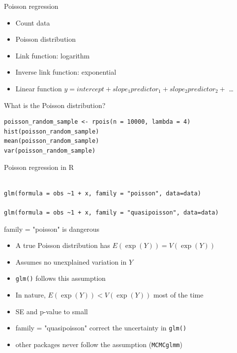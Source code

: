 \documentclass{beamer}
\makeatletter
\newenvironment{kframe}{%
 \def\at@end@of@kframe{}%
 \ifinner\ifhmode%
  \def\at@end@of@kframe{\end{minipage}}%
  \begin{minipage}{\columnwidth}%
 \fi\fi%
 \def\FrameCommand##1{\hskip\@totalleftmargin \hskip-\fboxsep
 \colorbox{shadecolor}{##1}\hskip-\fboxsep
     \hskip-\linewidth \hskip-\@totalleftmargin \hskip\columnwidth}%
 \MakeFramed {\advance\hsize-\width
   \@totalleftmargin\z@ \linewidth\hsize
   \@setminipage}}%
 {\par\unskip\endMakeFramed%
 \at@end@of@kframe}
\newenvironment{knitrout}{}{} %
\makeatother
\begin{document}
\begin{frame}{Poisson regression}
  \begin{itemize}
    \item Count data
    \item Poisson distribution
    \item Link function: logarithm
    \item Inverse link function: exponential
    \item Linear function $y = intercept + slope_1 predictor_1 + slope_2 predictor_2 +$ \dots
  \end{itemize}
\end{frame}


\begin{frame}[fragile]{What is the Poisson distribution?}

    
\begin{knitrout}
\color{fgcolor}\begin{kframe}
\begin{verbatim}
poisson_random_sample <- rpois(n = 10000, lambda = 4)  
hist(poisson_random_sample)
mean(poisson_random_sample)
var(poisson_random_sample)
\end{verbatim}
\end{kframe}
\end{knitrout}

\end{frame}

  
\begin{frame}[fragile]{Poisson regression in R}
    
\begin{knitrout}
\color{fgcolor}\begin{kframe}
\begin{verbatim}

glm(formula = obs ~1 + x, family = "poisson", data=data)

glm(formula = obs ~1 + x, family = "quasipoisson", data=data)
\end{verbatim}
\end{kframe}
\end{knitrout}

\begin{alertblock}{family = "poisson" is dangerous}
 \begin{itemize}
  \item A true Poisson distribution has $E(\exp(Y))=V(\exp(Y))$
  \item Assumes no unexplained variation in $Y$
  \item \texttt{glm()} follows this assumption
  \item In nature,  $E(\exp(Y)) < V(\exp(Y))$ most of the time
  \item SE and p-value to small
  \item family = "quasipoisson" correct the uncertainty in \texttt{glm()}
  \item other packages never follow the assumption (\texttt{MCMCglmm})
 \end{itemize}
\end{alertblock}

\end{frame}
\end{document}
